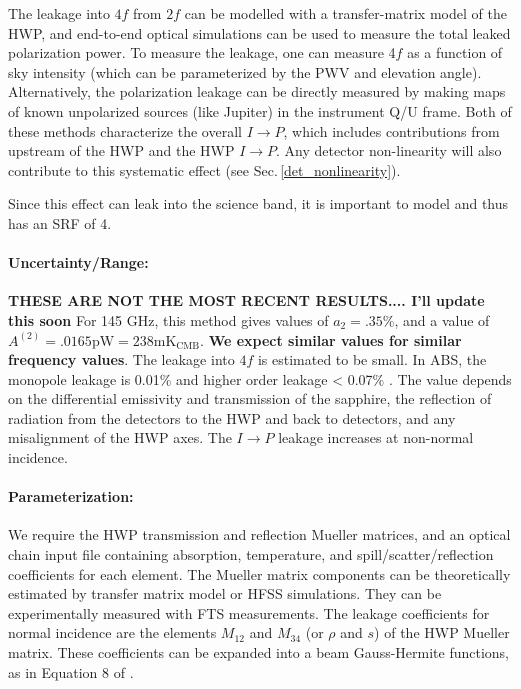 The leakage into $4f$ from $2f$ can be modelled with a transfer-matrix model of the HWP, and end-to-end optical simulations can be used to measure the total leaked polarization power. To measure the leakage, one can measure 4$f$ as a function of sky intensity (which can be parameterized by the PWV and elevation angle). Alternatively, the polarization leakage can be directly measured by making maps of known unpolarized sources (like Jupiter) in the instrument Q/U frame. Both of these methods characterize the overall $I \rightarrow P$, which includes contributions from upstream of the HWP and the HWP $I \rightarrow P$. Any detector non-linearity will also contribute to this systematic effect (see Sec.\,\ref{det_nonlinearity}).

Since this effect can leak into the science band, it is important to model and thus has an SRF of 4.

\paragraph{Uncertainty/Range:} 
\textbf{THESE ARE NOT THE MOST RECENT RESULTS.... I'll update this soon}
For 145 GHz, this method gives values of $a_2 = .35\%$, and a value of 
$A^{(2)} = .0165 \text{pW} = 238 \text{mK}_\text{CMB}$. 
\textbf{We expect similar values for similar frequency values}.
The leakage into $4f$ is estimated to be small. In ABS, the monopole leakage is 0.01\% and higher order leakage < 0.07\% \cite{Essinger-Hileman2016}. The value depends on the differential emissivity and transmission of the sapphire, the reflection of radiation from the detectors to the HWP and back to detectors, and any misalignment of the HWP axes. The $I \rightarrow P$ leakage increases at non-normal incidence.

\paragraph{Parameterization:}
We require the HWP transmission and reflection Mueller matrices\cite{Salatino16}, and an optical chain input file containing
absorption, temperature, and spill/scatter/reflection coefficients for each element. The Mueller matrix components can be theoretically estimated by transfer matrix model \cite{Essinger-Hileman13} or HFSS simulations. They can be experimentally measured with FTS measurements. The leakage coefficients for normal incidence are the elements $M_{12}$ and $M_{34}$ (or $\rho$ and $s$) of the HWP Mueller matrix. These coefficients can be expanded into a beam Gauss-Hermite functions, as in Equation 8 of \cite{Essinger-Hileman2016}.

